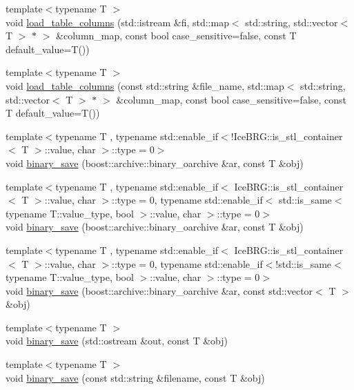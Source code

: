\begin{DoxyCompactItemize}
\item 
{\footnotesize template$<$typename T $>$ }\\void \hyperlink{namespaceIceBRG_ac0ffd49fd81c88cfada1e555c0bef325}{load\+\_\+table\+\_\+columns} (std\+::istream \&fi, std\+::map$<$ std\+::string, std\+::vector$<$ T $>$ $\ast$ $>$ \&column\+\_\+map, const bool case\+\_\+sensitive=false, const T default\+\_\+value=T())
\item 
{\footnotesize template$<$typename T $>$ }\\void \hyperlink{namespaceIceBRG_a613f4da18fa3608894513caf3abeb80a}{load\+\_\+table\+\_\+columns} (const std\+::string \&file\+\_\+name, std\+::map$<$ std\+::string, std\+::vector$<$ T $>$ $\ast$ $>$ \&column\+\_\+map, const bool case\+\_\+sensitive=false, const T default\+\_\+value=T())
\item 
{\footnotesize template$<$typename T , typename std\+::enable\+\_\+if$<$!\+Ice\+B\+R\+G\+::is\+\_\+stl\+\_\+container$<$ T $>$\+::value, char $>$\+::type  = 0$>$ }\\void \hyperlink{namespaceIceBRG_a8ad6dd269bdf0b61bfa03156b7334896}{binary\+\_\+save} (boost\+::archive\+::binary\+\_\+oarchive \&ar, const T \&obj)
\item 
{\footnotesize template$<$typename T , typename std\+::enable\+\_\+if$<$ Ice\+B\+R\+G\+::is\+\_\+stl\+\_\+container$<$ T $>$\+::value, char $>$\+::type  = 0, typename std\+::enable\+\_\+if$<$ std\+::is\+\_\+same$<$ typename T\+::value\+\_\+type, bool $>$\+::value, char $>$\+::type  = 0$>$ }\\void \hyperlink{namespaceIceBRG_aa9f1e3e52dfe4499a3c67814bed947bf}{binary\+\_\+save} (boost\+::archive\+::binary\+\_\+oarchive \&ar, const T \&obj)
\item 
{\footnotesize template$<$typename T , typename std\+::enable\+\_\+if$<$ Ice\+B\+R\+G\+::is\+\_\+stl\+\_\+container$<$ T $>$\+::value, char $>$\+::type  = 0, typename std\+::enable\+\_\+if$<$!std\+::is\+\_\+same$<$ typename T\+::value\+\_\+type, bool $>$\+::value, char $>$\+::type  = 0$>$ }\\void \hyperlink{namespaceIceBRG_abce0217603974a82ebb98e0b8064b156}{binary\+\_\+save} (boost\+::archive\+::binary\+\_\+oarchive \&ar, const std\+::vector$<$ T $>$ \&obj)
\item 
{\footnotesize template$<$typename T $>$ }\\void \hyperlink{namespaceIceBRG_a3597c081ff5001c7b440f80f0ff5b8ef}{binary\+\_\+save} (std\+::ostream \&out, const T \&obj)
\item 
{\footnotesize template$<$typename T $>$ }\\void \hyperlink{namespaceIceBRG_a13f20aa9889ffb60ebedbc7ed93190d8}{binary\+\_\+save} (const std\+::string \&filename, const T \&obj)

\end{DoxyCompactItemize}

